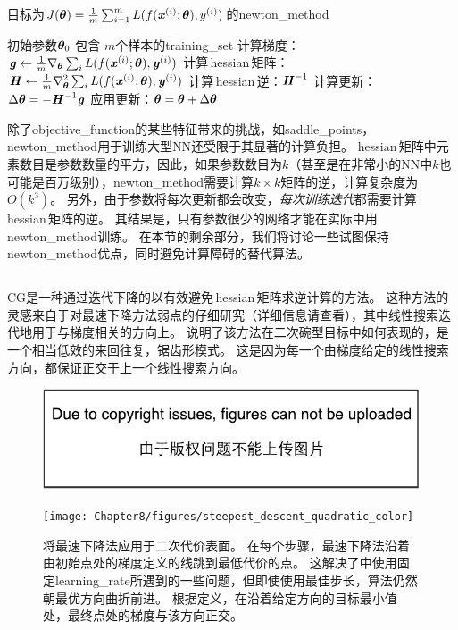 \begin{algorithm}[ht]
\caption{目标为$J(\boldsymbol{\theta})= \frac{1}{m} \sum_{i=1}^m L(f(\boldsymbol{\mathit{x}}^{(i)};\boldsymbol{\theta}), y^{(i)})$的\gls{newton_method}}
\label{alg:newton}
\begin{algorithmic}
\REQUIRE 初始参数$\boldsymbol{\theta}_{0}$
\REQUIRE 包含 $m$个样本的\gls{training_set}
      \STATE 计算梯度： $\boldsymbol{\mathit{g}} \leftarrow 
     \frac{1}{m} \nabla_{\boldsymbol{\theta}} \sum_i L(f(\boldsymbol{\mathit{x}}^{(i)};\boldsymbol{\theta}),\boldsymbol{\mathit{y}}^{(i)})$ 
      \STATE 计算\,\gls{hessian}\,矩阵：$\boldsymbol{\mathit{H}} \leftarrow  
     \frac{1}{m} \nabla_{\boldsymbol{\theta}}^2 \sum_i L(f(\boldsymbol{\mathit{x}}^{(i)};\boldsymbol{\theta}),\boldsymbol{\mathit{y}}^{(i)})$ 
    \STATE 计算\,\gls{hessian}\,逆：$\boldsymbol{\mathit{H}}^{-1}$
    \STATE 计算更新： $\Delta \boldsymbol{\theta} = - \boldsymbol{\mathit{H}}^{-1} \boldsymbol{\mathit{g}}$
    \STATE 应用更新：$\boldsymbol{\theta} = \boldsymbol{\theta}+\Delta \boldsymbol{\theta}$
\ENDWHILE
\end{algorithmic}
\end{algorithm}


除了\gls{objective_function}的某些特征带来的挑战，如\gls{saddle_points}，\gls{newton_method}用于训练大型\gls{NN}还受限于其显著的计算负担。
\gls{hessian}\,矩阵中元素数目是参数数量的平方，因此，如果参数数目为$k$（甚至是在非常小的\gls{NN}中$k$也可能是百万级别），\gls{newton_method}需要计算$k\times k$矩阵的逆，计算复杂度为$O(k^3)$。
另外，由于参数将每次更新都会改变，\emph{每次训练迭代}都需要计算\,\gls{hessian}\,矩阵的逆。
其结果是，只有参数很少的网络才能在实际中用\gls{newton_method}训练。
在本节的剩余部分，我们将讨论一些试图保持\gls{newton_method}优点，同时避免计算障碍的替代算法。

\subsection{}
\label{sec:conjugate_gradients}
\gls{CG}是一种通过迭代下降的以有效避免\,\gls{hessian}\,矩阵求逆计算的方法。
这种方法的灵感来自于对最速下降方法弱点的仔细研究（详细信息请查看），其中线性搜索迭代地用于与梯度相关的方向上。
说明了该方法在二次碗型目标中如何表现的，是一个相当低效的来回往复，锯齿形模式。
这是因为每一个由梯度给定的线性搜索方向，都保证正交于上一个线性搜索方向。

\begin{figure}[!htb]
\ifOpenSource
\centerline{\includegraphics{figure.pdf}}
\else
\centerline{\texttt{[image: Chapter8/figures/steepest\_descent\_quadratic\_color]}}
\fi
\caption{将最速下降法应用于二次代价表面。
在每个步骤，最速下降法沿着由初始点处的梯度定义的线跳到最低代价的点。
这解决了中使用固定\gls{learning_rate}所遇到的一些问题，但即使使用最佳步长，算法仍然朝最优方向曲折前进。
根据定义，在沿着给定方向的目标最小值处，最终点处的梯度与该方向正交。
}
\label{fig:chap8_steepest_descent_quadratic}
\end{figure}


